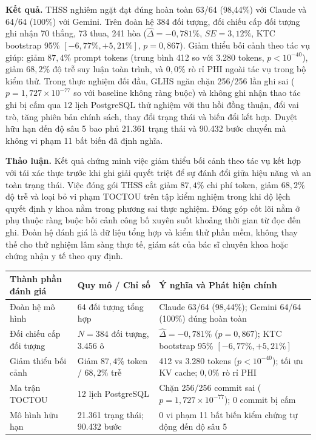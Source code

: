 \documentclass[10pt]{article}
\begin{document}
\textbf{Kết quả.} THSS nghiêm ngặt đạt đúng hoàn toàn 63/64 (98,44\%) với Claude và 64/64 (100\%) với Gemini. Trên đoàn hệ 384 đối tượng, đối chiếu cấp đối tượng ghi nhận 70 thắng, 73 thua, 241 hòa ($\hat{\Delta} = -0{,}781\%$, $SE=3{,}12\%$, KTC bootstrap 95\% $[-6{,}77\%, +5{,}21\%]$, $p=0{,}867$). Giảm thiểu bối cảnh theo tác vụ giúp: giảm $87{,}4\%$ prompt tokens (trung bình 412 so với 3.280 tokens, $p < 10^{-40}$), giảm $68{,}2\%$ độ trễ suy luận toàn trình, và $0{,}0\%$ rò rỉ PHI ngoài tác vụ trong bộ kiểm thử. Trong thực nghiệm đối đầu, GLHS ngăn chặn 256/256 lần ghi sai ($p = 1{,}727 \times 10^{-77}$ so với baseline không ràng buộc) và không ghi nhận thao tác ghi bị cấm qua 12 lịch PostgreSQL thử nghiệm với thu hồi đồng thuận, đổi vai trò, tăng phiên bản chính sách, thay đổi trạng thái và biến đổi kết hợp. Duyệt hữu hạn đến độ sâu 5 bao phủ 21.361 trạng thái và 90.432 bước chuyển mà không vi phạm 11 bất biến đã định nghĩa.

\textbf{Thảo luận.} Kết quả chứng minh việc giảm thiểu bối cảnh theo tác vụ kết hợp với tái xác thực trước khi ghi giải quyết triệt để sự đánh đổi giữa hiệu năng và an toàn trạng thái. Việc đóng gói THSS cắt giảm $87{,}4\%$ chi phí token, giảm $68{,}2\%$ độ trễ và loại bỏ vi phạm TOCTOU trên tập kiểm nghiệm trong khi độ lệch quyết định y khoa nằm trong phương sai thực nghiệm. Đóng góp cốt lõi nằm ở phụ thuộc ràng buộc bối cảnh công bố xuyên suốt khoảng thời gian từ đọc đến ghi. Đoàn hệ đánh giá là dữ liệu tổng hợp và kiểm thử phần mềm, không thay thế cho thử nghiệm lâm sàng thực tế, giám sát của bác sĩ chuyên khoa hoặc chứng nhận y tế theo quy định.

\begin{table}[h]\centering\small
\begin{tabularx}{\textwidth}{p{}p{}X}
\toprule
Thành phần đánh giá & Quy mô / Chỉ số & Ý nghĩa và Phát hiện chính\\
\midrule
Đoàn hệ mô hình & 64 đối tượng tổng hợp & Claude 63/64 (98,44\%); Gemini 64/64 (100\%) đúng hoàn toàn\\
Đối chiếu cấp đối tượng & $N=384$ đối tượng, 3.456 ô & $\hat{\Delta} = -0{,}781\%$ ($p=0{,}867$); KTC bootstrap 95\% $[-6{,}77\%, +5{,}21\%]$\\
Giảm thiểu bối cảnh & Giảm $87{,}4\%$ token / $68{,}2\%$ trễ & 412 vs 3.280 tokens ($p < 10^{-40}$); tối ưu KV cache; $0{,}0\%$ rò rỉ PHI\\
Ma trận TOCTOU & 12 lịch PostgreSQL & Chặn 256/256 commit sai ($p = 1{,}727 \times 10^{-77}$); 0 commit bị cấm\\
Mô hình hữu hạn & 21.361 trạng thái; 90.432 bước & 0 vi phạm 11 bất biến kiểm chứng tự động đến độ sâu 5\\
\bottomrule
\end{tabularx}\end{table}
\end{document}
